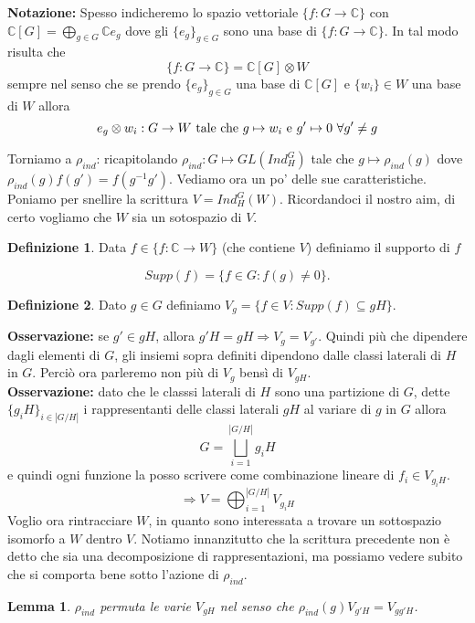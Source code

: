 \documentclass[11pt]{article}
\theoremstyle{plain}
\newtheorem{lemma}[thm]{Lemma}
\theoremstyle{definition}
\newtheorem{defn}{Definizione}[section]
\theoremstyle{remark}
\newcommand{\C}{\mathbb{C}}
\begin{document}
\textbf{Notazione:} Spesso indicheremo lo spazio vettoriale $\{f:G\rightarrow \C\}$ con $\C[G]=\bigoplus_{g\in G}\C e_g$ dove gli $\{e_g\}_{g\in G}$ sono una base di $\{f:G\rightarrow \C\}$. 
In tal modo risulta che 
\[\{f:G\rightarrow \C\}=\C[G]\otimes W\]
sempre nel senso che se prendo $\{e_g\}_{g\in G}$ una base di $\C[G]$ e $\{w_i\}\in W$ una base di $W$ allora 
\[e_g\otimes w_i:G\rightarrow W \textup{ tale che } g\mapsto w_i \textup{ e } g'\mapsto 0\ \forall g'\neq g\]

Torniamo a $\rho_{ind}$: ricapitolando $\rho_{ind}:G\mapsto GL(Ind_H^G)$ tale che $g\mapsto \rho_{ind}(g)$ dove $\rho_{ind}(g)f(g')=f(g^{-1}g')$. Vediamo ora un po' delle sue caratteristiche. Poniamo per snellire la scrittura $V=Ind_H^G(W)$. Ricordandoci il nostro aim, di certo vogliamo che $W$ sia un sotospazio di $V$.

\begin{defn}
Data $f\in \{f:\C\rightarrow W\}$ (che contiene $V$) definiamo il supporto di $f$ 

\[Supp(f)=\{f\in G:f(g)\neq 0\}.\]
\end{defn}

\begin{defn}
Dato $g\in G$ definiamo $V_g=\{f\in V : Supp(f)\subseteq gH \}$.
\end{defn}

\textbf{Osservazione:} se $g'\in gH$, allora $g'H=gH\Rightarrow V_g=V_{g'}$. Quindi più che dipendere dagli elementi di $G$, gli insiemi sopra definiti dipendono dalle classi laterali di $H$ in $G$. Perciò ora parleremo non più di $V_g$ bensì di $V_{gH}$.\\
\textbf{Osservazione:} dato che le classsi laterali di $H$ sono una partizione di $G$, dette $\{g_iH\}_{i\in |G/H|}$ i rappresentanti delle classi laterali $gH$ al variare di $g$ in $G$ allora 
\[G=\bigsqcup_{i=1}^{|G/H|} g_iH\] 
e quindi ogni funzione la posso scrivere come combinazione lineare di $f_i\in V_{g_iH}$.
\[\Rightarrow V=\bigoplus_{i=1}^{|G/H|} V_{g_iH}\]
Voglio ora rintracciare $W$, in quanto sono interessata a trovare un sottospazio isomorfo a $W$ dentro $V$. Notiamo innanzitutto che la scrittura precedente non è detto che sia una decomposizione di rappresentazioni, ma possiamo vedere subito che si comporta bene sotto l'azione di $\rho_{ind}$. 

\begin{lemma}
$\rho_{ind}$ permuta le varie $V_{gH}$ nel senso che $\rho_{ind}(g)V_{g'H}=V_{gg'H}$. 
\end{lemma}
\end{document}
